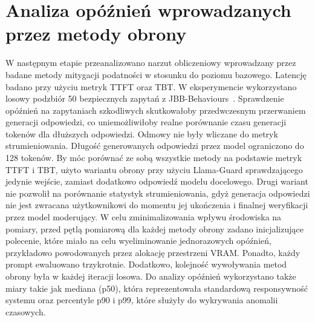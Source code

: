 \section{Analiza opóźnień wprowadzanych przez metody obrony}
W następnym etapie przeanalizowano narzut obliczeniowy wprowadzany przez badane metody mitygacji podatności w stosunku do poziomu bazowego. Latencję badano przy użyciu metryk \gls{TTFT} oraz \gls{TBT}. W eksperymencie wykorzystano losowy podzbiór 50 bezpiecznych zapytań z JBB-Behaviours~\cite{chao2024jailbreakbenchopenrobustnessbenchmark}. Sprawdzenie opóźnień na zapytaniach szkodliwych skutkowałoby przedwczesnym przerwaniem generacji odpowiedzi, co uniemożliwiłoby realne porównanie czasu generacji tokenów dla dłuższych odpowiedzi. Odmowy nie były wliczane do metryk strumieniowania. Długość generowanych odpowiedzi przez model ograniczono do 128 tokenów. By móc porównać ze sobą wszystkie metody na podstawie metryk \gls{TTFT} i \gls{TBT}, użyto wariantu obrony przy użyciu Llama-Guard sprawdzającego jedynie wejście, zamiast dodatkowo odpowiedź modelu docelowego. Drugi wariant nie pozwolił na porównanie statystyk strumieniowania, gdyż generacja odpowiedzi nie jest zwracana użytkownikowi do momentu jej ukończenia i finalnej weryfikacji przez model moderujący. W celu zminimalizowania wpływu środowiska na pomiary, przed pętlą pomiarową dla każdej metody obrony zadano inicjalizujące polecenie, które miało na celu wyeliminowanie jednorazowych opóźnień, przykładowo powodowanych przez alokację przestrzeni VRAM. Ponadto, każdy prompt ewaluowano trzykrotnie. Dodatkowo, kolejność wywoływania metod obrony była w każdej iteracji losowa. Do analizy opóźnień wykorzystano także miary takie jak mediana (p50), która reprezentowała standardową responsywność systemu oraz percentyle p90 i p99, które służyły do wykrywania anomalii czasowych.
